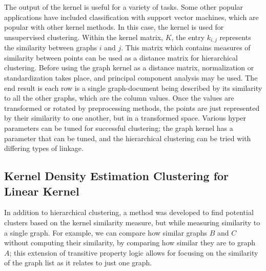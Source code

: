 The output of the kernel is useful for a variety of tasks. Some other popular applications have included classification with support vector machines, which are popular with other kernel methods. In this case, the kernel is used for unsupervised clustering. Within the kernel matrix, $K$, the entry $k_{i,j}$ represents the similarity between graphs $i$ and $j$. This matrix which contains measures of similarity between points can be used as a distance matrix for hierarchical clustering. Before using the graph kernel as a distance matrix, normalization or standardization takes place, and principal component analysis may be used. The end result is each row is a single graph-document being described by its similarity to all the other graphs, which are the column values. Once the values are transformed or rotated by preprocessing methods, the points are just represented by their similarity to one another, but in a transformed space. Various hyper parameters can be tuned for successful clustering; the graph kernel has a parameter that can be tuned, and the hierarchical clustering can be tried with differing types of linkage.


\subsection{Kernel Density Estimation Clustering for Linear Kernel}

In addition to hierarchical clustering, a method was developed to find potential clusters based on the kernel similarity measure, but while measuring similarity to a single graph. For example, we can compare how similar graphs $B$ and $C$ without computing their similarity, by comparing how similar they are to graph $A$; this extension of transitive property logic allows for focusing on the similarity of the graph list as it relates to just one graph. 










